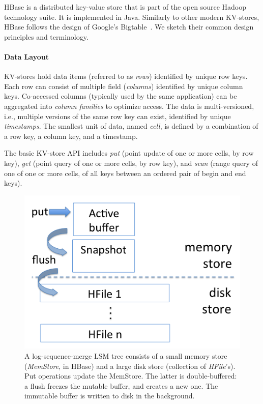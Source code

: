 
HBase is a distributed key-value store that is part of the open source Hadoop technology suite. 
It is implemented in Java. Similarly to other modern KV-stores, HBase follows the design of 
Google's Bigtable~\cite{Chang2008}. We sketch their common design principles 
and terminology. 

\paragraph{Data Layout}
KV-stores hold data items (referred to as \emph{rows}) identified by unique 
row keys. Each row can consist of multiple field (\emph{columns}) identified by unique 
column keys. Co-accessed columns (typically used by the same application) can be 
aggregated into  \emph{column families} to optimize access. The data is multi-versioned, 
i.e., multiple versions of the same row key can exist, identified by unique {\em timestamps}. 
The smallest unit of data, named {\em cell}, is defined by a combination of a row key, a
column key, and a timestamp.

The basic KV-store API includes \emph{put} (point update of one or more cells, by row key), 
\emph{get} (point query of one or more cells, by row key), and \emph{scan} (range query of one 
 of one or more cells, of all keys between an ordered pair of begin and end keys). 

\begin{figure}[tb]
\center
\includegraphics[width=0.9\columnwidth]{LSM} 
\caption{A log-sequence-merge LSM tree consists of a small memory store ({\em MemStore}, in HBase) 
and a large disk store (collection of {\em HFile}'s). Put operations update the MemStore. The latter is 
double-buffered: a flush freezes the mutable buffer, and creates a new one. 
The immutable buffer is written to disk in the background.}
\label{fig:LSM}
\end{figure}

